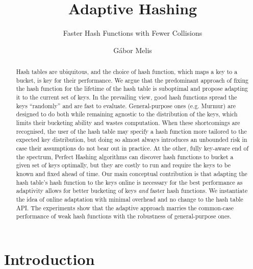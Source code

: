 \documentclass[sigconf]{acmart}
\begin{document}
\title{Adaptive Hashing}
\subtitle{Faster Hash Functions with Fewer Collisions}

\author{Gábor Melis}

\begin{abstract}
Hash tables are ubiquitous, and the choice of hash function, which maps a key to a bucket, is key for their performance.
We argue that the predominant approach of fixing the hash function for the lifetime of the hash table is suboptimal and propose adapting it to the current set of keys.
In the prevailing view, good hash functions spread the keys ``randomly'' and are fast to evaluate.
General-purpose ones (e.g. Murmur) are designed to do both while remaining agnostic to the distribution of the keys, which limits their bucketing ability and wastes computation.
When these shortcomings are recognised, the user of the hash table may specify a hash function more tailored to the expected key distribution, but doing so almost always introduces an unbounded risk in case their assumptions do not bear out in practice.
At the other, fully key-aware end of the spectrum, Perfect Hashing algorithms can discover hash functions to bucket a given set of keys optimally, but they are costly to run and require the keys to be known and fixed ahead of time.
Our main conceptual contribution is that adapting the hash table's hash function to the keys online is necessary for the best performance as
adaptivity allows for better bucketing of keys \emph{and} faster hash functions.
We instantiate the idea of online adaptation with minimal overhead and no change to the hash table API.
The experiments show that the adaptive approach marries the common-case performance of weak hash functions with the robustness of general-purpose ones.
\end{abstract}


\maketitle

\section{Introduction}
\end{document}
